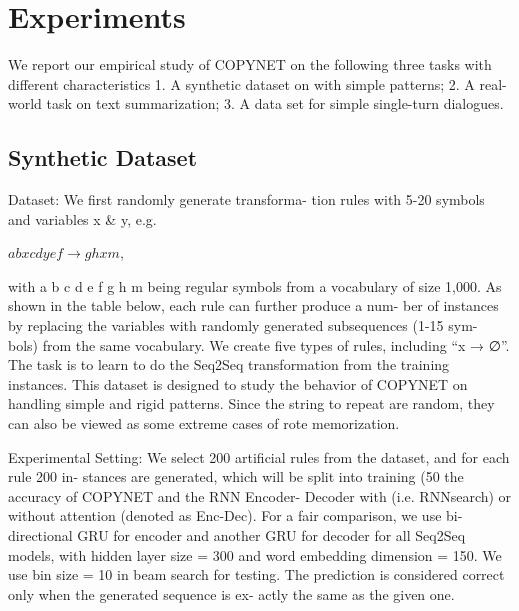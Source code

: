 \documentclass[UTF8]{ctexart}
\begin{document}
    \section{Experiments}
    We report our empirical study of COPYNET on the
    following three tasks with different characteristics
    1. A synthetic dataset on with simple patterns;
    2. A real-world task on text summarization;
    3. A data set for simple single-turn dialogues.
    \subsection{Synthetic Dataset}
    Dataset: We first randomly generate transforma-
    tion rules with 5-20 symbols and variables x \&
    y, e.g.

     $a b x c d y e f → g h x m,$

    with {a b c d e f g h m} being regular symbols
    from a vocabulary of size 1,000. As shown in the
    table below, each rule can further produce a num-
    ber of instances by replacing the variables with
    randomly generated subsequences (1-15 sym-
    bols) from the same vocabulary. We create five
    types of rules, including “x → ∅”. The task is
    to learn to do the Seq2Seq transformation from
    the training instances. This dataset is designed to
    study the behavior of COPYNET on handling simple and rigid patterns. Since the string to repeat
    are random, they can also be viewed as some extreme cases of rote memorization.
    

    Experimental Setting: We select 200 artificial
    rules from the dataset, and for each rule 200 in-
    stances are generated, which will be split into
    training (50%
    the accuracy of COPYNET and the RNN Encoder-
    Decoder with (i.e. RNNsearch) or without attention (denoted as Enc-Dec). For a fair comparison, we use bi-directional GRU for encoder and
    another GRU for decoder for all Seq2Seq models,
    with hidden layer size = 300 and word embedding
    dimension = 150. We use bin size = 10 in beam
    search for testing. The prediction is considered
    correct only when the generated sequence is ex-
    actly the same as the given one.
\end{document}
